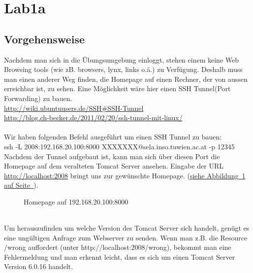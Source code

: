 \documentclass[12pt,a4paper,titlepage,oneside]{scrartcl}
\begin{document}
\maketitle
\setcounter{section}{0}
\setcounter{tocdepth}{2}
\tableofcontents

%
%

\section{Lab1a}

\subsection{Vorgehensweise}
Nachdem man sich in die Übungsumgebung einloggt, stehen einem keine Web Browsing tools (wie zB. browsers, lynx, links o.ä.) zu Verfügung. Deshalb muss man einen anderer Weg finden, die Homepage auf einen Rechner, der von aussen erreichbar ist, zu sehen. Eine Möglichkeit wäre hier einen SSH Tunnel(Port Forwarding) zu bauen.
\\ \url{http://wiki.ubuntuusers.de/SSH#SSH-Tunnel}
\\ \url{http://blog.ch-becker.de/2011/02/20/ssh-tunnel-mit-linux/}
\\
\\Wir haben folgenden Befehl ausgeführt um einen SSH Tunnel zu bauen:
\\ssh -L 2008:192.168.20.100:8000 XXXXXXX@sela.inso.tuwien.ac.at -p 12345
\\Nachdem der Tunnel aufgebaut ist, kann man sich über diesen Port die Homepage auf dem veralteten Tomcat Server ansehen. Eingabe der URL \url{http://localhost:2008} bringt uns zur gewünschte Homepage. 
(\hyperref[fig:image1]{siehe Abbildung~\ref*{fig:image1} auf Seite~\pageref*{fig:image1}}).
\begin{figure}[h!]
  \centering
  \caption{Homepage auf 192.168.20.100:8000}
  \label{fig:image1}
\end{figure}
\\
Um herauszufinden um welche Version des Tomcat Server sich handelt, genügt es eine ungültigen Anfrage zum Webserver zu senden. Wenn man z.B. die Resource /wrong auffordert (unter http://localhost:2008/wrong), bekommt man eine Fehlermeldung und man erkennt leicht, dass es sich um einen Tomcat Server Version 6.0.16 handelt.
\end{document}

